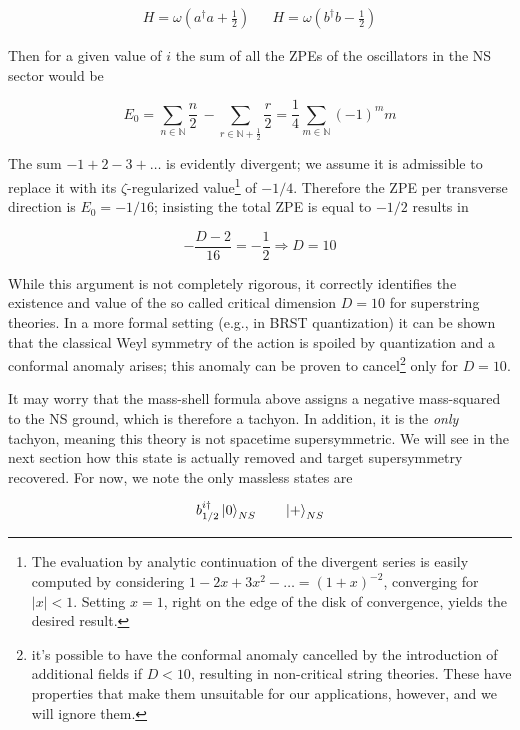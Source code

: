 \begin{align}
	H = \omega \left( a^\dagger a + \frac{1}{2} \right) && H = \omega \left( b^\dagger b - \frac{1}{2} \right)
	\label{}
\end{align}

Then for a given value of $i$ the sum of all the ZPEs of the oscillators in the NS sector would be

\begin{equation}
	E_0 =	\sum_{n\in \mathbb{N}} \frac{n}{2} \,- \sum_{r \in \mathbb{N}+\frac{1}{2}} \frac{r}{2} = \frac{1}{4} \sum_{m \in \mathbb{N}} (-1)^m m
	\label{}
\end{equation}

The sum $-1 + 2 - 3 + \ldots$ is evidently divergent; we assume it is admissible to replace it with its $\zeta$-regularized value\footnote{The evaluation by analytic continuation of the divergent series is easily computed by considering $1-2x + 3x^2 - \ldots = (1+x)^{-2}$, converging for $|x|<1$. Setting $x=1$, right on the edge of the disk of convergence, yields the desired result.} of $-1/4$. Therefore the ZPE per transverse direction is $E_0 = -1/16$; insisting the total ZPE is equal to $-1/2$ results in

\begin{equation}
	-\frac{D-2}{16} = -\frac{1}{2} \Rightarrow D = 10
	\label{}
\end{equation}

While this argument is not completely rigorous, it correctly identifies the existence and value of the so called critical dimension $D=10$ for superstring theories. In a more formal setting (e.g., in BRST quantization) it can be shown that the classical Weyl symmetry of the action is spoiled by quantization and a conformal anomaly arises; this anomaly can be proven to cancel\footnote{it's possible to have the conformal anomaly cancelled by the introduction of additional fields if $D<10$, resulting in non-critical string theories. These have properties that make them unsuitable for our applications, however, and we will ignore them.} only for $D=10$.

It may worry that the mass-shell formula above assigns a negative mass-squared to the NS ground, which is therefore a tachyon. In addition, it is the \emph{only} tachyon, meaning this theory is not spacetime supersymmetric. We will see in the next section how this state is actually removed and target supersymmetry recovered. For now, we note the only massless states are

\begin{equation}
	b_{1/2}^{i\dagger} \ket{0}_{NS} \quad \quad \ket{+}_{NS}
	\label{openmassless}
\end{equation}

